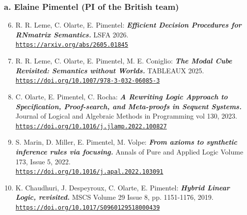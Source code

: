 \documentclass[a4paper]{article}
\def\myperiod{.}
\def\webref#1{\href{#1}%
     {{#1}}}
\newcommand{\copubsitemref}[4]{
  \item#1:
  {\def\bfdefault{bx}\bf\emph{#2\myperiod}} #3.
  \\{\small\tt\webref{#4}}
}
\begin{document}
\subsubsection*{a. Elaine Pimentel (PI of the British team)}

\begin{enumerate}[noitemsep]
\setcounter{enumi}{5}

\copubsitemref{R. R. Leme, C. Olarte, E. Pimentel}{Efficient Decision Procedures for RNmatrix Semantics}{LSFA 2026}{https://arxiv.org/abs/2605.01845}\label{ref:Trinity}

\copubsitemref{R. R. Leme, C. Olarte, E. Pimentel, M. E. Coniglio}{The Modal Cube Revisited: Semantics without Worlds}{TABLEAUX 2025}{https://doi.org/10.1007/978-3-032-06085-3\textunderscore10}\label{ref:cube}

\copubsitemref{C. Olarte, E. Pimentel, C. Rocha}{A Rewriting Logic Approach to Specification, Proof-search, and Meta-proofs in Sequent Systems}{Journal of Logical and Algebraic Methods in Programming vol 130, 2023}{https://doi.org/10.1016/j.jlamp.2022.100827}\label{ref:rew}

\copubsitemref{S. Marin, D. Miller, E. Pimentel, M. Volpe}{From axioms to synthetic inference rules via focusing}{Annals of Pure and Applied Logic Volume 173, Issue 5, 2022}{https://doi.org/10.1016/j.apal.2022.103091}\label{ref:dale}

\copubsitemref{K. Chaudhuri, J. Despeyroux, C. Olarte, E. Pimentel}{Hybrid Linear Logic, revisited}{MSCS Volume 29 Issue 8, pp. 1151-1176, 2019}{https://doi.org/10.1017/S0960129518000439}\label{ref:kaustuv}
\end{enumerate}
\end{document}
